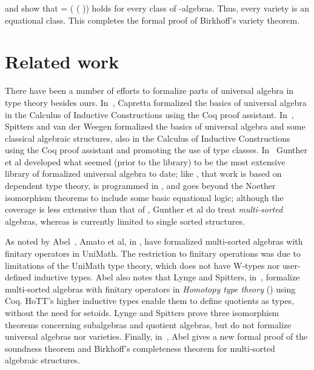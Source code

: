  and  show that
  =  ( ( )) holds for every class  of -algebras.
Thus, every variety is an equational class. This completes the formal proof of Birkhoff's variety theorem.

\section{Related work}
There have been a number of efforts to formalize parts of universal algebra in
type theory besides ours.
In~\cite{Capretta:1999}, Capretta formalized the basics of universal algebra in the
   Calculus of Inductive Constructions using the Coq proof assistant.
In~\cite{Spitters:2011}, Spitters and van der Weegen formalized the basics of universal algebra
   and some classical algebraic structures, also in the Calculus of Inductive Constructions using
   the Coq proof assistant and promoting the use of type classes.
In~\cite{Gunther:2018} Gunther et al developed what seemed (prior to the \agdaalgebras library) to be
   the most extensive library of formalized universal algebra to date; like \agdaalgebras,
   that work is based on dependent type theory, is programmed in \agda, and goes beyond the
   Noether isomorphism theorems to include some basic equational logic; although the
   coverage is less extensive than that of \agdaalgebras, Gunther et al do treat
   \emph{multi-sorted} algebras, whereas \agdaalgebras is currently limited to single
   sorted structures.

As noted by Abel~\cite{Abel:2021}, Amato et al, in \cite{Amato:2021}, have
   formalized multi-sorted algebras with finitary operators in UniMath. The restriction to
   finitary operations was due to limitations of the UniMath type theory, which does
   not have W-types nor user-defined inductive types.
Abel also notes that Lynge and Spitters, in~\cite{Lynge:2019}, formalize multi-sorted
   algebras with finitary operators in \emph{Homotopy type theory} (\cite{HoTT}) using
   Coq.  HoTT's higher inductive types enable them to define quotients as types, without
   the need for setoids.  Lynge and Spitters prove three isomorphism theorems concerning
   subalgebras and quotient algebras, but do not formalize universal algebras nor varieties.
Finally, in~\cite{Abel:2021}, Abel gives a new formal proof of the soundness theorem and
   Birkhoff's completeness theorem for multi-sorted algebraic structures.

